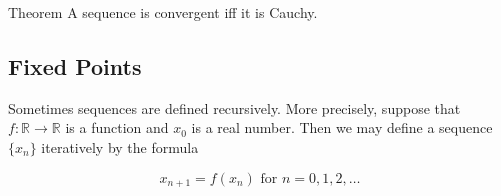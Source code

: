         \begin{theorem}{Theorem}
            A sequence is convergent iff it is Cauchy.
        \end{theorem}

    \subsection{Fixed Points}           %

        Sometimes sequences are defined recursively. More precisely, suppose that $f:\mathbb{R}\to\mathbb{R}$ is a function and $x_0$ is a real number. Then we may define a sequence $\{x_n\}$ iteratively by the formula

        \[
            x_{n+1} = f(x_n) \text{ for } n = 0,1,2,\dots
        \]

